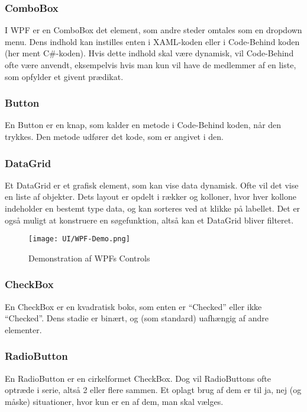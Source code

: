 \subsubsection*{ComboBox}
I WPF er en ComboBox det element, som andre steder omtales som en dropdown menu. 
Dens indhold kan instilles enten i XAML-koden eller i Code-Behind koden (her ment C\#-koden).
Hvis dette indhold skal være dynamisk, vil Code-Behind ofte være anvendt, eksempelvis hvis man kun vil have de medlemmer af en liste, som opfylder et givent prædikat. 

\subsubsection*{Button}
En Button er en knap, som kalder en metode i Code-Behind koden, når den trykkes. 
Den metode udfører det kode, som er angivet i den.

\subsubsection*{DataGrid}
Et DataGrid er et grafisk element, som kan vise data dynamisk.
Ofte vil det vise en liste af objekter.
Dets layout er opdelt i rækker og kolloner, hvor hver kollone indeholder en bestemt type data, og kan sorteres ved at klikke på labellet.
Det er også muligt at konstruere en søgefunktion, altså kan et DataGrid bliver filteret.

\begin{wrapfigure}[22]{R}{0.5\textwidth}
    \label{img:wpfdemo}
    \vspace{-30pt}
    \begin{center}
        \texttt{[image: UI/WPF-Demo.png]}
    \end{center}
    \vspace{-15pt}
    \caption{Demonstration af WPFs Controls}
    \vspace{-15pt}
\end{wrapfigure}

\subsubsection*{CheckBox}
En CheckBox er en kvadratisk boks, som enten er ``Checked'' eller ikke ``Checked''. 
Dens stadie er binært, og (som standard) uafhængig af andre elementer.

\subsubsection*{RadioButton}
En RadioButton er en cirkelformet CheckBox.
Dog vil RadioButtons ofte optræde i serie, altså 2 eller flere sammen.
Et oplagt brug af dem er til ja, nej (og måske) situationer, hvor kun er en af dem, man skal vælges.

